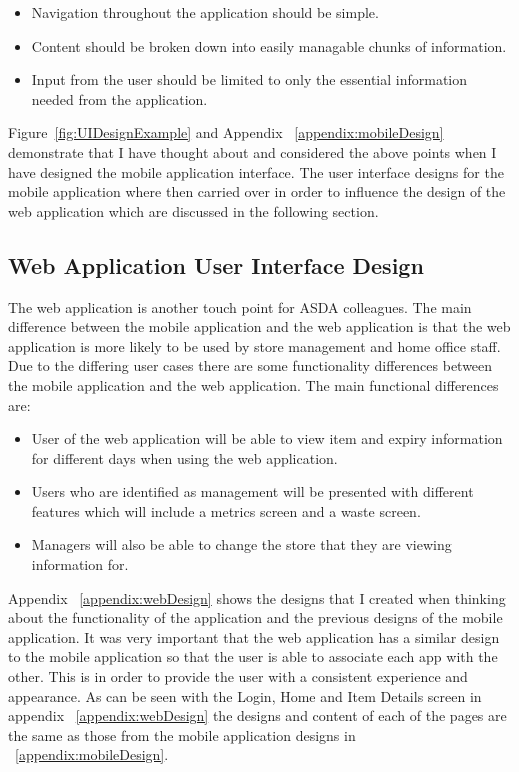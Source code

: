 \documentclass[a4paper,11pt]{report}
\begin{document}
\begin{itemize}
    \item Navigation throughout the application should be simple.
    \item Content should be broken down into easily managable chunks of information.
    \item Input from the user should be limited to only the essential information needed from the application.
\end{itemize}

Figure~\ref{fig:UIDesignExample} and Appendix ~\ref{appendix:mobileDesign} demonstrate that I have thought about and considered the above points when I have designed the mobile application interface. The user interface designs for the mobile application where then carried over in order to influence the design of the web application which are discussed in the following section.

\subsection{Web Application User Interface Design}

The web application is another touch point for ASDA colleagues. The main difference between the mobile application and the web application is that the web application is more likely to be used by store management and home office staff. Due to the differing user cases there are some functionality differences between the mobile application and the web application. The main functional differences are:
\begin{itemize}
    \item User of the web application will be able to view item and expiry information for different days when using the web application.
    \item Users who are identified as management will be presented with different features which will include a metrics screen and a waste screen.
    \item Managers will also be able to change the store that they are viewing information for. 
\end{itemize}

Appendix ~\ref{appendix:webDesign} shows the designs that I created when thinking about the functionality of the application and the previous designs of the mobile application. 
It was very important that the web application has a similar design to the mobile application so that the user is able to associate each app with the other. This is in order to provide the user with a consistent experience and appearance. As can be seen with the Login, Home and Item Details screen in appendix ~\ref{appendix:webDesign} the designs and content of each of the pages are the same as those from the mobile application designs in ~\ref{appendix:mobileDesign}.
\end{document}
